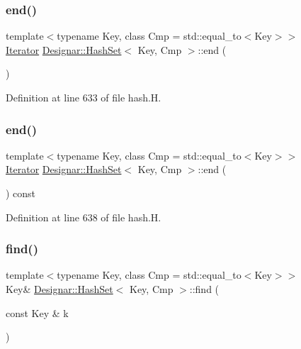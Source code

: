 \subsubsection{\texorpdfstring{end()}{end()}\hspace{0.1cm}{\footnotesize\ttfamily [1/2]}}
{\footnotesize\ttfamily template$<$typename Key, class Cmp = std\+::equal\+\_\+to$<$\+Key$>$$>$ \\
\hyperlink{class_designar_1_1_hash_set_1_1_iterator}{Iterator} \hyperlink{class_designar_1_1_hash_set}{Designar\+::\+Hash\+Set}$<$ Key, Cmp $>$\+::end (\begin{DoxyParamCaption}{ }\end{DoxyParamCaption})\hspace{0.3cm}{\ttfamily [inline]}}



Definition at line 633 of file hash.\+H.

\mbox{\label{class_designar_1_1_hash_set_ae136c18f4602ec2053a4c73b8c5c5946}} 
\subsubsection{\texorpdfstring{end()}{end()}\hspace{0.1cm}{\footnotesize\ttfamily [2/2]}}
{\footnotesize\ttfamily template$<$typename Key, class Cmp = std\+::equal\+\_\+to$<$\+Key$>$$>$ \\
\hyperlink{class_designar_1_1_hash_set_1_1_iterator}{Iterator} \hyperlink{class_designar_1_1_hash_set}{Designar\+::\+Hash\+Set}$<$ Key, Cmp $>$\+::end (\begin{DoxyParamCaption}{ }\end{DoxyParamCaption}) const\hspace{0.3cm}{\ttfamily [inline]}}



Definition at line 638 of file hash.\+H.

\mbox{\label{class_designar_1_1_hash_set_a96df362356788b6f3f1261a526a1fd82}} 
\subsubsection{\texorpdfstring{find()}{find()}\hspace{0.1cm}{\footnotesize\ttfamily [1/2]}}
{\footnotesize\ttfamily template$<$typename Key, class Cmp = std\+::equal\+\_\+to$<$\+Key$>$$>$ \\
Key\& \hyperlink{class_designar_1_1_hash_set}{Designar\+::\+Hash\+Set}$<$ Key, Cmp $>$\+::find (\begin{DoxyParamCaption}\item[{const Key \&}]{k }\end{DoxyParamCaption})\hspace{0.3cm}{\ttfamily [inline]}}



